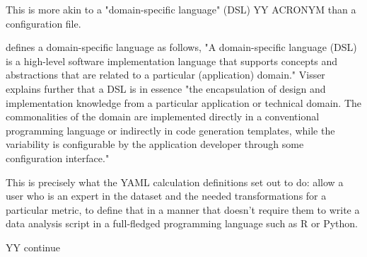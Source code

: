 \documentclass[3p,times,procedia]{elsarticle}
\begin{document}
This is more akin to a "domain-specific language" (DSL) YY ACRONYM than a configuration file.

\cite{Visser2008} defines a domain-specific language as follows, "A domain-specific language (DSL) is a high-level software implementation language that supports concepts and abstractions that are related to a particular (application) domain." Visser explains further that a DSL is in essence "the encapsulation of design and implementation knowledge from a particular application or technical domain. The commonalities of the domain are implemented directly in a conventional programming language or indirectly in code generation templates, while the variability is configurable by the application developer through some configuration interface."

This is precisely what the YAML calculation definitions set out to do: allow a user who is an expert in the dataset and the needed transformations for a particular metric, to define that in a manner that doesn't require them to write a data analysis script in a full-fledged programming language such as R or Python.

YY continue

%


%
%
\end{document}
